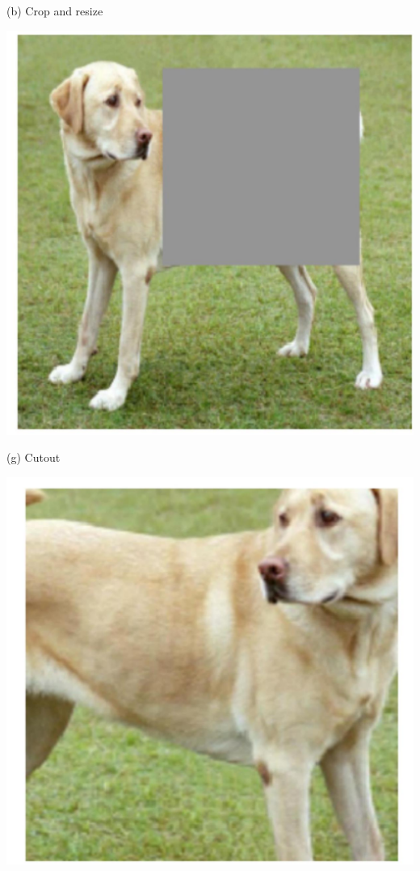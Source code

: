 \documentclass[10pt]{article}
\begin{document}
(b) Crop and resize

\begin{center}
\includegraphics[max width=\textwidth]{2024_01_08_959e2db67a31f073f6d2g-24(4)}
\end{center}

(g) Cutout

\begin{center}
\includegraphics[max width=\textwidth]{2024_01_08_959e2db67a31f073f6d2g-24(2)}
\end{center}
\end{document}
